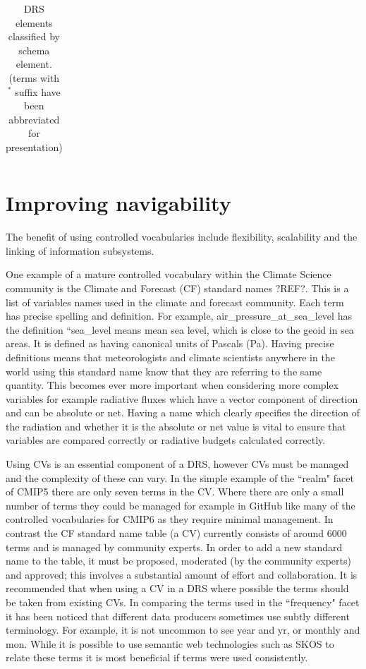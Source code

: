 \documentclass[final,1p,times,twocolumn,authoryear]{elsarticle}
\begin{document}
{{\begin{table}[htb!]
\begin{tabular}{p{1.4cm} p{2.0cm} p{2.1cm} p{2.1cm} p{1.4cm} p{2.0cm} }
\end{tabular}
\caption{DRS elements classified by schema element. (terms with $^*$ suffix have been abbreviated for presentation)}
\end{table}




\section{Improving navigability}

The benefit of using controlled vocabularies include flexibility, scalability and the linking of information subsystems. 

One example of a mature controlled vocabulary within the Climate Science community is the Climate and Forecast (CF) standard names ?REF?. This is a list of variables names used in the climate and forecast community. Each term has precise spelling and definition. For example,  air\_pressure\_at\_sea\_level has the definition ``sea\_level means mean sea level, which is close to the geoid in sea areas. It is defined as having canonical units of Pascals (Pa).  Having precise definitions means that meteorologists and climate scientists anywhere in the world using this standard name know that they are referring to the same quantity. This becomes ever more important when considering more complex variables for example radiative fluxes which have a vector component of direction and can be absolute or net. Having a name which clearly specifies the direction of the radiation and whether it is the absolute or net value is vital to ensure that variables are compared correctly or radiative budgets calculated correctly.     

Using CVs is an essential component of a DRS, however CVs must be managed and the complexity of these can vary. In the simple example of the ``realm" facet of CMIP5 there are only seven terms in the CV. Where there are only a small number of terms they could be managed for example in GitHub like many of the controlled vocabularies for CMIP6 as they require minimal management. In contrast the CF standard name table (a CV) currently consists of around 6000 terms and is managed by community experts. In order to add a new standard name to the table, it must be proposed, moderated (by the community experts) and approved; this involves a substantial amount of effort and collaboration. It is recommended that when using a CV in a DRS where possible the terms should be taken from existing CVs. In comparing the terms used in the ``frequency" facet it has been noticed that different data producers sometimes use subtly different terminology. For example, it is not uncommon to see year and yr, or monthly and mon. While it is possible to use semantic web technologies such as SKOS to relate these terms it is most beneficial if terms were used consistently. 

}}
\end{document}
